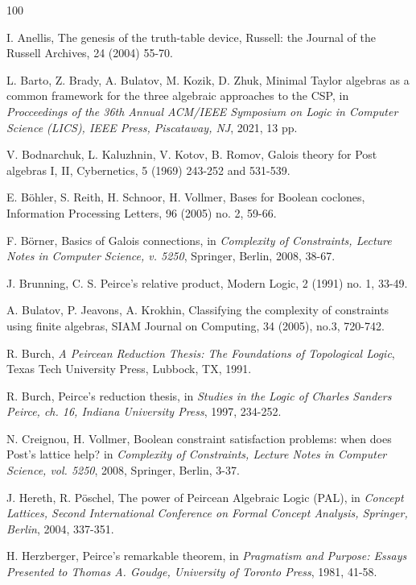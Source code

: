 \documentclass[11pt]{article}
\theoremstyle{plain}
\theoremstyle{definition}
\begin{document}
{\footnotesize

\begin{thebibliography}{100}  

 I. Anellis, The genesis of the truth-table device, Russell: the Journal of the Russell Archives, 24 (2004) 55-70.

 L. Barto, Z. Brady, A. Bulatov, M. Kozik, D. Zhuk, 
Minimal Taylor algebras as a common framework for the three algebraic approaches to the CSP, in {\it Procceedings of the 36th Annual ACM/IEEE Symposium on Logic in Computer Science (LICS), IEEE Press, Piscataway, NJ}, 2021, 13 pp.

 V. Bodnarchuk, L. Kaluzhnin, V. Kotov, B. Romov, Galois theory for Post algebras I, II, Cybernetics, 5 (1969) 243-252 and 531-539.

 E. B\"ohler, S. Reith, H. Schnoor, H. Vollmer, Bases for Boolean coclones, Information Processing Letters, 96 (2005) no. 2, 59-66. 

 F. B\"orner, Basics of Galois connections, in {\it Complexity of Constraints, Lecture Notes in Computer Science, v. 5250}, Springer, Berlin, 2008, 38-67.

 J. Brunning, C. S. Peirce's relative product, Modern Logic, 2 (1991) no. 1, 33-49. 

 A. Bulatov, P. Jeavons, A. Krokhin, Classifying the complexity of constraints using finite algebras, SIAM Journal on Computing, 34 (2005), no.3, 720-742.

 R. Burch, {\it A Peircean Reduction Thesis: The Foundations of Topological Logic}, Texas Tech University Press, Lubbock, TX, 1991.  

 R. Burch, Peirce's reduction thesis, in {\it Studies in the Logic of {C}harles {S}anders {P}eirce, ch. 16, Indiana University Press}, 1997, 234-252.

 N. Creignou, H. Vollmer, Boolean constraint satisfaction problems: when does Post’s lattice help? in {\it Complexity of Constraints, Lecture Notes in Computer Science, vol. 5250}, 2008, Springer, Berlin, 3-37. 

 J. Hereth, R. P\"oschel, The power of {P}eircean {A}lgebraic {L}ogic ({PAL}), in {\it Concept Lattices, Second International Conference on Formal Concept Analysis, Springer, Berlin}, 2004, 337-351.

 H. Herzberger, Peirce’s remarkable theorem, in {\it Pragmatism and Purpose: Essays Presented to Thomas A. Goudge, University of Toronto Press}, 1981, 41-58.


\end{thebibliography}}
\end{document}
